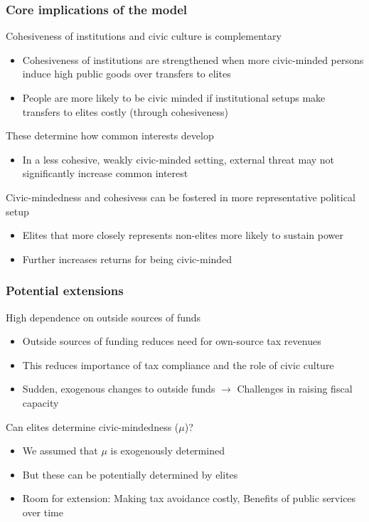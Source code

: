\documentclass[aspectratio=169]{beamer}
\begin{document}
\begin{frame}
\frametitle{Core implications of the model} 
Cohesiveness of institutions and civic culture is complementary
\begin{itemize}\setlength\itemsep{3pt}
\item Cohesiveness of institutions are strengthened when more civic-minded persons induce high public goods over transfers to elites
\item People are more likely to be civic minded if institutional setups make transfers to elites costly (through cohesiveness)
\end{itemize}\medskip
These determine how common interests develop
\begin{itemize}\setlength\itemsep{3pt}
\item In a less cohesive, weakly civic-minded setting, external threat may not significantly increase common interest
\end{itemize}\medskip
Civic-mindedness and cohesivess can be fostered in more representative political setup
\begin{itemize}\setlength\itemsep{3pt}
\item Elites that more closely represents non-elites more likely to sustain power
\item Further increases returns for being civic-minded
\end{itemize}\medskip
\end{frame}

\begin{frame}
\frametitle{Potential extensions} 
High dependence on outside sources of funds
\begin{itemize}\setlength\itemsep{3pt}
\item Outside sources of funding reduces need for own-source tax revenues
\item This reduces importance of tax compliance and the role of civic culture
\item Sudden, exogenous changes to outside funds $\to$ Challenges in raising fiscal capacity 
\end{itemize}\medskip
Can elites determine civic-mindedness ($\mu$)?
\begin{itemize}\setlength\itemsep{3pt}
\item We assumed that $\mu$ is exogenously determined
\item But these can be potentially determined by elites
\item Room for extension: Making tax avoidance costly, Benefits of public services over time
\end{itemize}\medskip
\end{frame}
\end{document}
